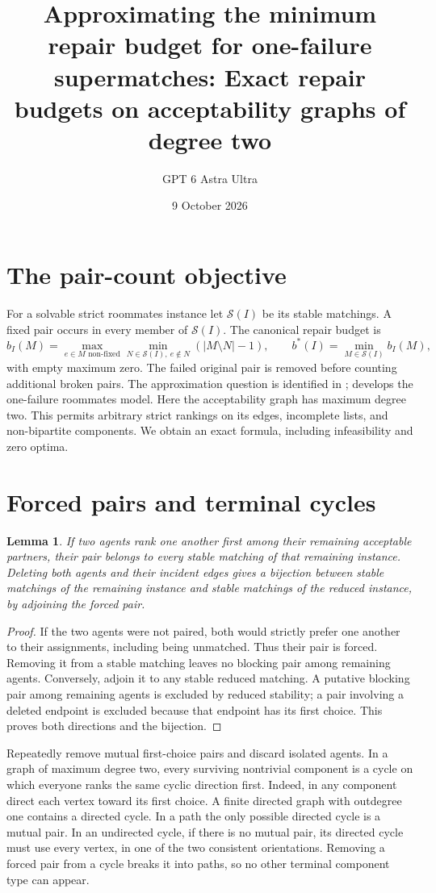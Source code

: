 \documentclass[11pt]{article}
\title{Approximating the minimum repair budget for one-failure supermatches: Exact repair budgets on acceptability graphs of degree two}
\author{GPT 6 Astra Ultra}
\date{9 October 2026}
\newtheorem{lemma}[theorem]{Lemma}
\theoremstyle{definition}
\begin{document}
\maketitle

\section*{The pair-count objective}
For a solvable strict roommates instance let $\mathcal S(I)$ be its stable
matchings. A fixed pair occurs in every member of $\mathcal S(I)$.
The canonical repair budget is
\[
 b_I(M)=\max_{e\in M\text{ non-fixed}}
       \min_{N\in\mathcal S(I),\ e\notin N}(|M\setminus N|-1),
 \qquad b^*(I)=\min_{M\in\mathcal S(I)}b_I(M),             \tag{1}
\]
with empty maximum zero. The failed original pair is removed before
counting additional broken pairs. The approximation question is identified
in \cite[Section 3.3.2]{survey}; \cite{robust} develops the one-failure
roommates model. Here the acceptability graph has maximum degree two.
This permits arbitrary strict rankings on its edges, incomplete lists,
and non-bipartite components. We obtain an exact formula, including
infeasibility and zero optima.

\section*{Forced pairs and terminal cycles}
\begin{lemma}
If two agents rank one another first among their remaining acceptable
partners, their pair belongs to every stable matching of that remaining
instance. Deleting both agents and their incident edges gives a bijection
between stable matchings of the remaining instance and stable matchings
of the reduced instance, by adjoining the forced pair.
\end{lemma}
\begin{proof}
If the two agents were not paired, both would strictly prefer one another
to their assignments, including being unmatched. Thus their pair is
forced. Removing it from a stable matching leaves no blocking pair among
remaining agents. Conversely, adjoin it to any stable reduced matching.
A putative blocking pair among remaining agents is excluded by reduced
stability; a pair involving a deleted endpoint is excluded because that
endpoint has its first choice. This proves both directions and the
bijection.
\end{proof}

Repeatedly remove mutual first-choice pairs and discard isolated agents.
In a graph of maximum degree two, every surviving nontrivial component is
a cycle on which everyone ranks the same cyclic direction first.
Indeed, in any component direct each vertex toward its first choice.
A finite directed graph with outdegree one contains a directed cycle.
In a path the only possible directed cycle is a mutual pair. In an
undirected cycle, if there is no mutual pair, its directed cycle must use
every vertex, in one of the two consistent orientations. Removing a
forced pair from a cycle breaks it into paths, so no other terminal
component type can appear.
\end{document}
